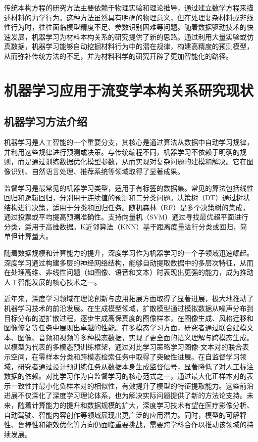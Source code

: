传统本构方程的研究方法主要依赖于物理实验和理论推导，通过建立数学方程来描述材料的力学行为。这种方法虽然具有明确的物理意义，但在处理复杂材料或非线性行为时，往往面临模型精度不足、参数识别困难等问题\cite{amamotoDatadrivenApproachesStructureproperty2022}。随着数据驱动技术的快速发展，机器学习为材料本构关系的研究提供了新的思路。通过利用大量实验或仿真数据，机器学习能够自动挖掘材料行为中的潜在规律，构建高精度的预测模型，从而弥补传统方法的不足，并为材料科学的研究开辟了更加智能化的路径。
\section{机器学习应用于流变学本构关系研究现状}
\subsection{机器学习方法介绍}
机器学习是人工智能的一个重要分支，其核心是通过算法从数据中自动学习规律，并利用这些规律进行预测或决策。与传统编程不同，机器学习不依赖于明确的规则，而是通过训练数据优化模型参数，从而实现对复杂问题的建模和解决。它在图像识别、自然语言处理、推荐系统等领域取得了显著成果\cite{wang2023scientific}。

监督学习是最常见的机器学习类型，适用于有标签的数据集。常见的算法包括线性回归和逻辑回归，分别用于连续值的预测和二分类问题\cite{uesaka1973theory,liu2021self}。决策树（DT）通过树状结构进行决策，适用于分类和回归任务\cite{quinlan1986induction}。随机森林（RF）是多个决策树的集成，通过投票或平均提高预测准确性\cite{breiman2001random}。支持向量机（SVM）通过寻找最优超平面进行分类，适用于高维数据\cite{cortes1995support}。K近邻算法（KNN）基于距离度量进行分类或回归，简单但计算量大\cite{cover1967nearest}。

随着数据规模和计算能力的提升，深度学习作为机器学习的一个子领域迅速崛起。深度学习通过构建多层的神经网络结构，能够自动提取数据中的多层次特征，从而在处理高维、非线性问题（如图像、语音和文本）时表现出更强的能力，成为推动人工智能发展的核心技术之一\cite{wang2023scientific}。

近年来，深度学习领域在理论创新与应用拓展方面取得了显著进展，极大地推动了机器学习技术的前沿发展。在生成模型领域，扩散模型通过模拟数据从噪声分布到目标分布的逆扩散过程，逐步生成高保真度的图像样本，在图像生成、风格迁移和图像修复等任务中展现出卓越的性能\cite{yang2023diffusion}。在多模态学习方面，研究者通过联合建模文本、图像、音频和视频等多种模态数据，实现了更全面的语义理解与跨模态生成。以模型为代表的多模态预训练框架，通过对比学习策略学习图像-文本对的联合表示空间，在零样本分类和跨模态检索任务中取得了突破性进展\cite{xu2023multimodal}。在自监督学习领域，研究者通过设计预训练任务从数据本身生成监督信号，显著降低了对人工标注数据的依赖\cite{Xie2023}。对比学习作为自监督学习的核心范式之一，通过最大化正样本对的表示一致性并最小化负样本对的相似性，有效提升了模型的特征提取能力\cite{Zhu2024Vision}。这些前沿进展不仅深化了深度学习理论体系，也为解决实际问题提供了新的方法论支持。未来，随着计算能力的提升和数据规模的扩大，深度学习技术有望在医疗影像分析、自动驾驶、智能内容创作等领域展现出更广泛的应用潜力。同时，模型的可解释性、鲁棒性和能效优化等方向仍面临重要挑战，需要跨学科合作以推动该领域的持续发展\cite{wang2023scientific}。

